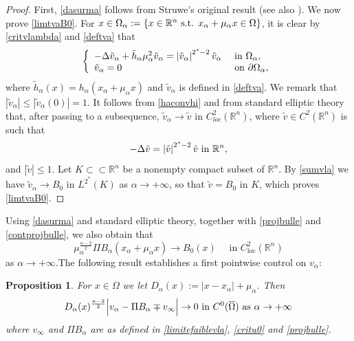 \documentclass[10pt]{amsart}
\numberwithin{equation}{section}
\newcommand{\R}{\mathbb{R}}
\newcommand{\Om}{\Omega}
\newcommand{\ma}{\mu_\alpha}
\def \rr {\mathbb{R}}
\def \bb{\hbox}
\def \xl{x_\alpha}
\def \ls{+\infty}
\def\la{\alpha}
\def \ma{\mu_{\alpha}}
\def \tva{\tilde{v}_{\alpha}}
\def \ha{h_{\alpha}}
\def \tha{\tilde{h}_{\alpha}}
\def \vo {v_{\infty}}
\DeclareMathOperator{\loc}{loc}
\theoremstyle{plain}
\newtheorem{prop}{Proposition}[section]%
\theoremstyle{remark}
\begin{document}
\begin{proof}
First, \eqref{dasurma} follows from Struwe's original result \cite{Struwe} (see also \cite[Theorem 1.2]{Mazumdar2}).  We now prove \eqref{limtvaB0}.	For $x\in \Om_{\la}:= \{x\in \rr^n \bb{ s.t. } \xl+\ma x\in \Om\}$, it is clear by \eqref{critvlambda} and \eqref{deftva} that
	\begin{equation*}
		\left\{\begin{array}{ll}
			-\Delta \tva +\tha\ma^2 \tva=\left|\tva\right|^{2^*-2}\tva &\hbox{ in } \Om_{\la}, \\
			\tva=0  &\hbox{ on } \partial \Om_{\la},
		\end{array}\right.
	\end{equation*}
where $\tha(x)=\ha(\xl+\ma x)$ and $\tva$ is defined in \eqref{deftva}. We remark that $|\tva|\leq |\tva(0)|= 1$. It follows from \eqref{haconvhi} and from standard elliptic theory that, after passing to a subsequence, $\tva \to \tilde{v}$ in $C^2_{loc}(\rr^n)$,	where $\tilde{v}\in C^2(\rr^n)$ is such that 
	\begin{equation*}
		-\Delta \tilde{v}=\left|\tilde{v}\right|^{2^*-2}\tilde{v} \hbox{ in } \rr^n, 
	\end{equation*}
	and $|\tilde{v}| \leq 1$. Let $K\subset\subset \rr^n$ be a nonempty compact subset of $\rr^n$. By \eqref{sumvla} we have 
	$\tva\to B_0$ in $L^{2^*}(K)$ as $\la\to \ls$, so that $\tilde{v}=B_0$ in $K$, which proves \eqref{limtvaB0}.
\end{proof}
Using \eqref{dasurma} and standard elliptic theory, together with \eqref{projbulle} and \eqref{contprojbulle}, we also obtain that 
\begin{equation} \label{contprojbulle2}
\ma^{\frac{n-2}{2}} \Pi B_\alpha(x_\alpha + \ma x) \to B_0(x) \quad \text{ in } C^2_{\loc}(\R^n)
\end{equation}
as $\alpha \to + \infty$.The following result establishes a first pointwise control on $v_\alpha$: 

\begin{prop}\label{limiteinLinfini}
For $x \in \Om$ we let $D_{\la}(x):= |x-\xl|+\ma$. Then 
\begin{equation}\label{eq:limiteinLinfini}
D_{\la}(x)^{\frac{n-2}{2}}\Big| v_{\la} -\Pi B_{\la} \mp\vo\Big|\to 0 \bb{ in } C^0(\overline{\Om}) \bb{ as }\la\to \ls
\end{equation}
where $v_{\infty}$ and $\Pi B_{\alpha}$ are as defined in \eqref{limitefaiblevla}, \eqref{critu0} and   \eqref{projbulle}. 
\end{prop}
\end{document}
